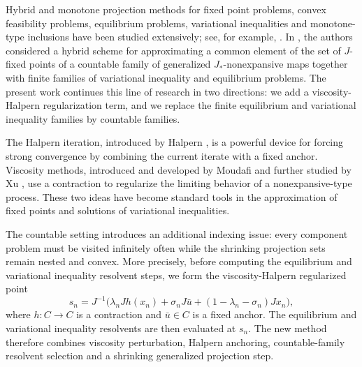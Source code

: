 \documentclass[leqno,12pt]{amsart}
\theoremstyle{definition}
\numberwithin{equation}{section}
\begin{document}
Hybrid and monotone projection methods for fixed point problems, convex feasibility problems, equilibrium problems, variational inequalities and monotone-type inclusions have been studied extensively; see, for example, \cite{Alber1996,AlberRyazantseva2006,BlumOettli1994,ChidumeIdu2016,ChidumeOtuboEzeaUba2017,Cioranescu1990,CombettesHirstoaga2005,IbarakiTakahashi2007,KamimuraTakahashi2002,KlineamSuantaiTakahashi2012,KohsakaTakahashi2007,NakajoTakahashi2003,QinSu2008,Takahashi2000,TakahashiZembayashi2008,UbaOtuboOnyido2021,ZegeyeShahzad2011,ZegeyeShahzad2014}. In \cite{UbaCarpathian2023}, the authors considered a hybrid scheme for approximating a common element of the set of $J$-fixed points of a countable family of generalized $J_{*}$-nonexpansive maps together with finite families of variational inequality and equilibrium problems. The present work continues this line of research in two directions: we add a viscosity-Halpern regularization term, and we replace the finite equilibrium and variational inequality families by countable families.

The Halpern iteration, introduced by Halpern \cite{Halpern1967}, is a powerful device for forcing strong convergence by combining the current iterate with a fixed anchor. Viscosity methods, introduced and developed by Moudafi \cite{Moudafi2000} and further studied by Xu \cite{Xu2004}, use a contraction to regularize the limiting behavior of a nonexpansive-type process. These two ideas have become standard tools in the approximation of fixed points and solutions of variational inequalities.

The countable setting introduces an additional indexing issue: every component problem must be visited infinitely often while the shrinking projection sets remain nested and convex. More precisely, before computing the equilibrium and variational inequality resolvent steps, we form the viscosity-Halpern regularized point
\[
s_n=J^{-1}\big(\lambda_nJh(x_n)+\sigma_nJ\bar u+(1-\lambda_n-\sigma_n)Jx_n\big),
\]
where $h:C\to C$ is a contraction and $\bar u\in C$ is a fixed anchor. The equilibrium and variational inequality resolvents are then evaluated at $s_n$. The new method therefore combines viscosity perturbation, Halpern anchoring, countable-family resolvent selection and a shrinking generalized projection step.
\end{document}
